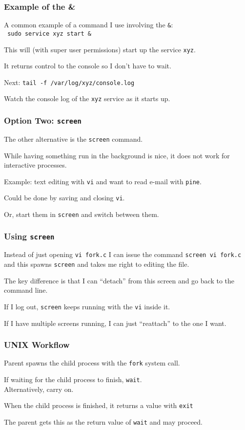 \begin{frame}
	\frametitle{Example of the \&}

	A common example of a command I use involving the \texttt{\&}:\\
	\texttt{ sudo service xyz start \& }

	This will (with super user permissions) start up the service \texttt{xyz}.

	It returns control to the console so I don't have to wait.

	Next: \texttt{tail -f /var/log/xyz/console.log}

	Watch the console log of the \texttt{xyz} service as it starts up.

\end{frame}

\begin{frame}
	\frametitle{Option Two: \texttt{screen}}

	The other alternative is the \texttt{screen} command.

	While having something run in the background is nice, it does not work for interactive processes.

	Example: text editing with \texttt{vi} and want to read e-mail with \texttt{pine}.

	Could be done by saving and closing \texttt{vi}.

	Or, start them in \texttt{screen} and switch between them.

\end{frame}

\begin{frame}
	\frametitle{Using \texttt{screen}}
	Instead of just opening \texttt{vi fork.c} I can issue the command \texttt{screen vi fork.c} and this spawns \texttt{screen} and takes me right to editing the file.

	The key difference is that I can ``detach'' from this screen and go back to the command line.

	If I log out, \texttt{screen} keeps running with the \texttt{vi} inside it.

	If I have multiple screens running, I can just ``reattach'' to the one I want.

\end{frame}

\begin{frame}
	\frametitle{UNIX Workflow}

	Parent spawns the child process with the \texttt{fork} system call.

	If waiting for the child process to finish, \texttt{wait}.\\
	\quad Alternatively, carry on.

	When the child process is finished, it returns a value with \texttt{exit}

	The parent gets this as the return value of \texttt{wait} and may proceed.
\end{frame}

